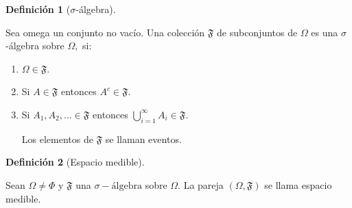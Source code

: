 \documentclass[
  us-letterpaper,
]{scrreprt}
\theoremstyle{plain}
\theoremstyle{plain}
\theoremstyle{definition}
\newtheorem{definition}{Definición}[chapter]
\theoremstyle{remark}
\begin{document}
\begin{definition}[\(\sigma\)-álgebra]\protect\hypertarget{def-sigma_algebra}{}\label{def-sigma_algebra}

Sea omega un conjunto no vacío. Una colección \(\mathfrak{F}\) de
subconjuntos de \(\Omega\) es una \(\sigma\)-álgebra sobre \(\Omega,\)
si:

\begin{enumerate}
\def\labelenumi{\roman{enumi}.}
\item
  \(\Omega \in  \mathfrak{F}\).
\item
  Si \(A \in \mathfrak{F}\) entonces \(A^c \in \mathfrak{F}\).
\item
  Si \(A_1, A_2, ... \in \mathfrak{F}\) entonces
  \(\bigcup_{i=1}^{\infty} A_i \in \mathfrak{F}\).

  Los elementos de \(\mathfrak{F}\) se llaman eventos.
\end{enumerate}

\end{definition}

\begin{definition}[Espacio
medible]\protect\hypertarget{def-espacio_medible}{}\label{def-espacio_medible}

Sean \(\Omega \neq \Phi\) y \(\mathfrak{F}\) una
\(\sigma-\text{álgebra}\) sobre \(\Omega\). La pareja
\((\Omega, \mathfrak{F})\) se llama espacio medible.

\end{definition}
\end{document}
